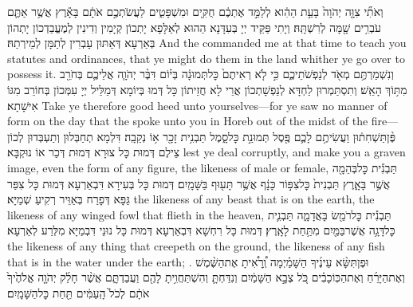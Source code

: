 {וְאֹתִ֞י צִוָּ֤ה יְהֹוָה֙ בָּעֵ֣ת הַהִ֔וא לְלַמֵּ֣ד אֶתְכֶ֔ם חֻקִּ֖ים וּמִשְׁפָּטִ֑ים לַעֲשֹׂתְכֶ֣ם אֹתָ֔ם בָּאָ֕רֶץ אֲשֶׁ֥ר אַתֶּ֛ם עֹבְרִ֥ים שָׁ֖מָּה לְרִשְׁתָּֽהּ׃}
{וְיָתִי פַּקֵּיד יְיָ בְּעִדָּנָא הַהוּא לְאַלָּפָא יָתְכוֹן קְיָמִין וְדִינִין לְמֶעֱבַדְכוֹן יָתְהוֹן בְּאַרְעָא דְּאַתּוּן עָבְרִין לְתַמָּן לְמֵירְתַהּ׃}
{And the \lord\space commanded me at that time to teach you statutes and ordinances, that ye might do them in the land whither ye go over to possess it.}{}
{וְנִשְׁמַרְתֶּ֥ם מְאֹ֖ד לְנַפְשֹׁתֵיכֶ֑ם כִּ֣י לֹ֤א רְאִיתֶם֙ כׇּל\maqqaf תְּמוּנָ֔ה בְּי֗וֹם דִּבֶּ֨ר יְהֹוָ֧ה אֲלֵיכֶ֛ם בְּחֹרֵ֖ב מִתּ֥וֹךְ הָאֵֽשׁ׃}
{וְתִסְתַּמְרוּן לַחְדָּא לְנַפְשָׁתְכוֹן אֲרֵי לָא חֲזֵיתוֹן כָּל דְּמוּ בְּיוֹמָא דְּמַלֵּיל יְיָ עִמְּכוֹן בְּחוֹרֵב מִגּוֹ אִישָׁתָא׃}
{Take ye therefore good heed unto yourselves—for ye saw no manner of form on the day that the \lord\space spoke unto you in Horeb out of the midst of the fire—}{}
{פֶּ֨ן\maqqaf תַּשְׁחִת֔וּן וַעֲשִׂיתֶ֥ם לָכֶ֛ם פֶּ֖סֶל תְּמוּנַ֣ת כׇּל\maqqaf סָ֑מֶל תַּבְנִ֥ית זָכָ֖ר א֥וֹ נְקֵבָֽה׃}
{דִּלְמָא תְחַבְּלוּן וְתַעְבְּדוּן לְכוֹן צֵילֶם דְּמוּת כָּל צוּרָא דְּמוּת דְּכַר אוֹ נוּקְבָּא׃}
{lest ye deal corruptly, and make you a graven image, even the form of any figure, the likeness of male or female,}{}
{תַּבְנִ֕ית כׇּל\maqqaf בְּהֵמָ֖ה אֲשֶׁ֣ר בָּאָ֑רֶץ תַּבְנִית֙ כׇּל\maqqaf צִפּ֣וֹר כָּנָ֔ף אֲשֶׁ֥ר תָּע֖וּף בַּשָּׁמָֽיִם׃}
{דְּמוּת כָּל בְּעִירָא דִּבְאַרְעָא דְּמוּת כָּל צִפַּר גַּפָּא דְּפָרַח בְּאַוֵּיר רְקִיעַ שְׁמַיָּא׃}
{the likeness of any beast that is on the earth, the likeness of any winged fowl that flieth in the heaven,}{}
{תַּבְנִ֕ית כׇּל\maqqaf רֹמֵ֖שׂ בָּאֲדָמָ֑ה תַּבְנִ֛ית כׇּל\maqqaf דָּגָ֥ה אֲשֶׁר\maqqaf בַּמַּ֖יִם מִתַּ֥חַת לָאָֽרֶץ׃}
{דְּמוּת כָּל רִחְשָׁא דִּבְאַרְעָא דְּמוּת כָּל נוּנֵי דִּבְמַיָּא מִלְּרַע לְאַרְעָא׃}
{the likeness of any thing that creepeth on the ground, the likeness of any fish that is in the water under the earth; .}{}
{וּפֶן\maqqaf תִּשָּׂ֨א עֵינֶ֜יךָ הַשָּׁמַ֗יְמָה וְֽ֠רָאִ֠יתָ אֶת\maqqaf הַשֶּׁ֨מֶשׁ וְאֶת\maqqaf הַיָּרֵ֜חַ וְאֶת\maqqaf הַכּֽוֹכָבִ֗ים כֹּ֚ל צְבָ֣א הַשָּׁמַ֔יִם וְנִדַּחְתָּ֛ וְהִשְׁתַּחֲוִ֥יתָ לָהֶ֖ם וַעֲבַדְתָּ֑ם אֲשֶׁ֨ר חָלַ֜ק יְהֹוָ֤ה אֱלֹהֶ֙יךָ֙ אֹתָ֔ם לְכֹל֙ הָֽעַמִּ֔ים תַּ֖חַת כׇּל\maqqaf הַשָּׁמָֽיִם׃}

